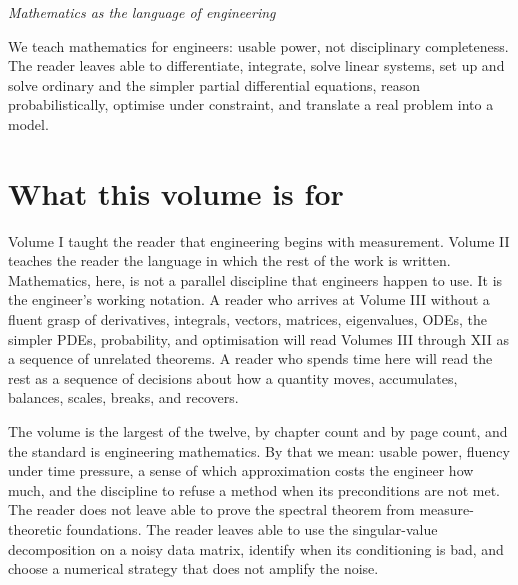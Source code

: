 
\vspace*{1.5cm}
\begin{center}
\itshape\large
Mathematics as the language of engineering
\end{center}
\vspace{0.5cm}

\noindent
We teach mathematics for engineers: usable power, not disciplinary completeness. The reader leaves able to differentiate, integrate, solve linear systems, set up and solve ordinary and the simpler partial differential equations, reason probabilistically, optimise under constraint, and translate a real problem into a model.

\vspace{0.5cm}

\section*{What this volume is for}

Volume I taught the reader that engineering begins with measurement. Volume II teaches the reader the language in which the rest of the work is written. Mathematics, here, is not a parallel discipline that engineers happen to use. It is the engineer's working notation. A reader who arrives at Volume III without a fluent grasp of derivatives, integrals, vectors, matrices, eigenvalues, ODEs, the simpler PDEs, probability, and optimisation will read Volumes III through XII as a sequence of unrelated theorems. A reader who spends time here will read the rest as a sequence of decisions about how a quantity moves, accumulates, balances, scales, breaks, and recovers.

The volume is the largest of the twelve, by chapter count and by page count, and the standard is engineering mathematics. By that we mean: usable power, fluency under time pressure, a sense of which approximation costs the engineer how much, and the discipline to refuse a method when its preconditions are not met. The reader does not leave able to prove the spectral theorem from measure-theoretic foundations. The reader leaves able to use the singular-value decomposition on a noisy data matrix, identify when its conditioning is bad, and choose a numerical strategy that does not amplify the noise.

